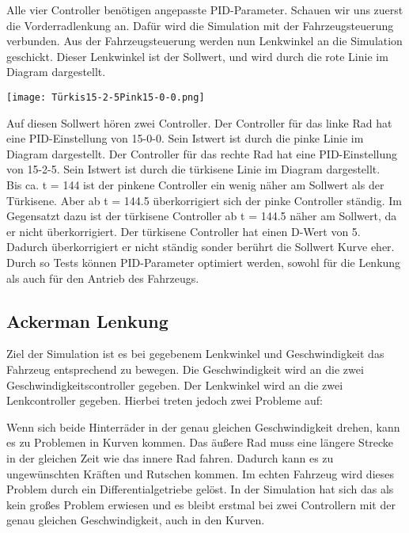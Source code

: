 Alle vier Controller benötigen angepasste PID-Parameter.
Schauen wir uns zuerst die Vorderradlenkung an. 
Dafür wird die Simulation mit der Fahrzeugsteuerung verbunden.
Aus der Fahrzeugsteuerung werden nun Lenkwinkel an die Simulation geschickt.
Dieser Lenkwinkel ist der Sollwert, und wird durch die rote Linie im Diagram dargestellt.
\begin{center}
    \texttt{[image: Türkis15-2-5Pink15-0-0.png]}
\end{center}
Auf diesen Sollwert hören zwei Controller.
Der Controller für das linke Rad hat eine PID-Einstellung von 15-0-0.
Sein Istwert ist durch die pinke Linie im Diagram dargestellt.
Der Controller für das rechte Rad hat eine PID-Einstellung von 15-2-5.
Sein Istwert ist durch die türkisene Linie im Diagram dargestellt.\\
Bis ca. t = 144 ist der pinkene Controller ein wenig näher am Sollwert als der Türkisene.
Aber ab t = 144.5 überkorrigiert sich der pinke Controller ständig. 
Im Gegensatzt dazu ist der türkisene Controller ab t = 144.5 näher am Sollwert, da er nicht überkorrigiert.
Der türkisene Controller hat einen D-Wert von 5. Dadurch überkorrigiert er nicht ständig sonder berührt die Sollwert Kurve eher.\\
Durch so Tests können PID-Parameter optimiert werden, sowohl für die Lenkung als auch für den Antrieb des Fahrzeugs.

\subsection{Ackerman Lenkung}
Ziel der Simulation ist es bei gegebenem Lenkwinkel und Geschwindigkeit das Fahrzeug entsprechend zu bewegen.
Die Geschwindigkeit wird an die zwei Geschwindigkeitscontroller gegeben.
Der Lenkwinkel wird an die zwei Lenkcontroller gegeben.
Hierbei treten jedoch zwei Probleme auf:

Wenn sich beide Hinterräder in der genau gleichen Geschwindigkeit drehen, kann es zu Problemen in Kurven kommen.
Das äußere Rad muss eine längere Strecke in der gleichen Zeit wie das innere Rad fahren. 
Dadurch kann es zu ungewünschten Kräften und Rutschen kommen.
Im echten Fahrzeug wird dieses Problem durch ein Differentialgetriebe gelöst.
In der Simulation hat sich das als kein großes Problem erwiesen und es bleibt erstmal bei zwei Controllern mit der genau gleichen Geschwindigkeit, auch in den Kurven.

